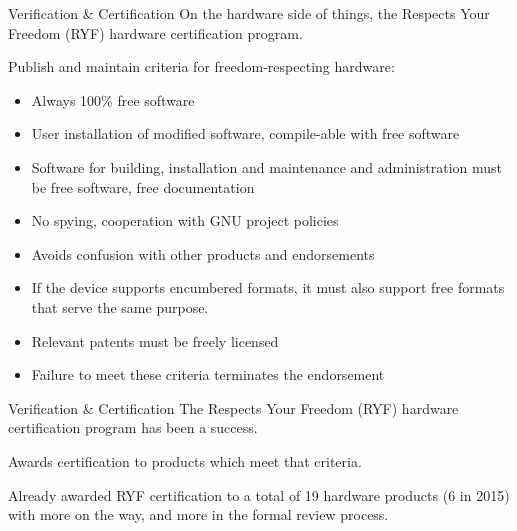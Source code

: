 \documentclass[
  size=12pt,
  style=simple,
  paper=screen
]{powerdot}
\begin{document}
\begin{wideslide}{Verification \& Certification}
  On the hardware side of things, the Respects Your Freedom (RYF)
  hardware certification program.
  \pp

  \begin{itemize}
    \nitem Publish and maintain criteria for freedom-respecting
    hardware:

    \pp

    \begin{itemize}
    \item Always 100\% free software \pp
    \item User installation of modified software, compile-able with free software \pp
    \item Software for building, installation and maintenance and
      administration must be free software, free documentation \pp
    \item No spying, cooperation with GNU project policies \pp
    \item Avoids confusion with other products and endorsements \pp
    \item If the device supports encumbered formats, it must also
      support free formats that serve the same purpose. \pp
    \item Relevant patents must be freely licensed \pp
    \item Failure to meet these criteria terminates the endorsement
    \end{itemize}

  \end{itemize}
\end{wideslide}

\begin{wideslide}{Verification \& Certification}
  The Respects Your Freedom (RYF) hardware certification program has been a success.

  \pp

  \begin{itemize}
    \setlength{\itemsep}{1em}

    \nitem Awards certification to products which meet that criteria.

    \pp

    \nitem Already awarded RYF certification to a total of 19 hardware
    products (6 in 2015) \pp with more on the way, and more in the
    formal review process.

  \end{itemize}
\end{wideslide}
\end{document}
